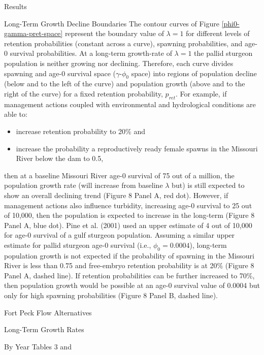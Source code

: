 \documentclass[12pt]{article}
\begin{document}
\begin{section}{Results}
\begin{subsection}{Long-Term Growth Decline Boundaries}
The contour curves of Figure \ref{phi0-gamma-pret-space} represent the boundary value of $\lambda=1$ for different levels of retention probabilities (constant across a curve), spawning probabilities, and age-0 survival probabilities.  At a long-term growth-rate of $\lambda=1$ the pallid sturgeon population is neither growing nor declining.  Therefore, each curve divides spawning and age-0 survival space ($\gamma$-$\phi_0$ space) into regions of population decline (below and to the left of the curve) and population growth (above and to the right of the curve) for a fixed retention probability, $p_{ret}$.  For example, if management actions coupled with environmental and hydrological conditions are able to:
\begin{itemize}
\item increase retention probability to 20\% and
\item increase the probability a reproductively ready female spawns in the Missouri River below the dam to 0.5, 
\end{itemize}
then at a baseline Missouri River age-0 survival of 75 out of a million, the population growth rate (will increase from baseline $\lambda$ but) is still expected to show an overall declining trend (Figure 8 Panel A, red dot).  However, if management actions also influence turbidity, increasing age-0 survival to 25 out of 10,000, then the population is expected to increase in the long-term (Figure 8 Panel A, blue dot).  Pine et al. (2001) used an upper estimate of 4 out of 10,000 for age-0 survival of a gulf sturgeon population.  Assuming a similar upper estimate for pallid sturgeon age-0 survival (i.e., $\phi_0=0.0004$), long-term population growth is not expected if the probability of spawning in the Missouri River is less than 0.75 and free-embryo retention probability is at 20\% (Figure 8 Panel A, dashed line). If retention probabilities can be further increased to 70\%, then population growth would be possible at an age-0 survival value of 0.0004  but only for high spawning probabilities (Figure 8 Panel B, dashed line).             
\end{subsection}

\begin{subsection}{Fort Peck Flow Alternatives}
\begin{subsubsection}{Long-Term Growth Rates}
\begin{paragraph}{By Year}
Tables 3 and 


\end{paragraph}
\end{subsubsection}
\end{subsection}
\end{section}
\end{document}
